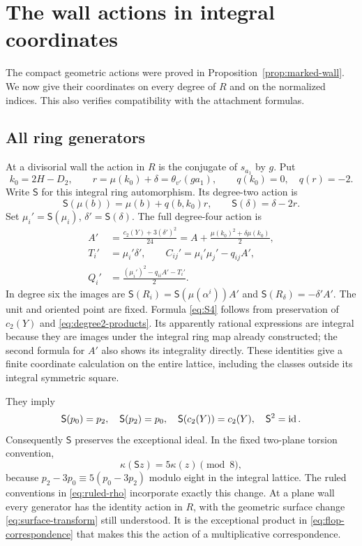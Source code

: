 \section{The wall actions in integral coordinates}\label{sec:actions}

The compact geometric actions were proved in
Proposition~\ref{prop:marked-wall}. We now give their
coordinates on every degree of $R$ and on the normalized
indices. This also verifies compatibility with the
attachment formulas.

\subsection{All ring generators}
At a divisorial wall the action in $R$ is the conjugate
of $s_{a_1}$ by $g$. Put
\begin{equation}\label{eq:reflection-root}
 k_0=2H-D_2,\qquad r=\mu(k_0)+\delta
             =\theta_{v'}(ga_1),\qquad q(k_0)=0,
 \quad q(r)=-2.
\end{equation}
Write $\mathsf S$ for this integral ring automorphism. Its degree-two
action is
\begin{equation}\label{eq:S2}
 \mathsf S(\mu(b))=\mu(b)+q(b,k_0)r,\qquad \mathsf S(\delta)=\delta-2r.
\end{equation}
Set $\mu_i'=\mathsf S(\mu_i)$, $\delta'=\mathsf S(\delta)$. The full
degree-four action is
\begin{equation}\label{eq:S4}
 \begin{aligned}
 A'&=\frac{c_2(Y)+3(\delta')^2}{24}
     =A+\frac{\mu(k_0)^2+\delta\mu(k_0)}2,\\
 T_i'&=\mu_i'\delta',\qquad
 C_{ij}'=\mu_i'\mu_j'-q_{ij}A',\\
 Q_i'&=\frac{(\mu_i')^2-q_{ii}A'-T_i'}2.
 \end{aligned}
\end{equation}
In degree six the images are
$\mathsf S(R_i)=\mathsf S(\mu(\alpha^i))A'$ and
$\mathsf S(R_\delta)=-\delta'A'$. The unit and oriented point are
fixed. Formula \eqref{eq:S4} follows from preservation of
$c_2(Y)$ and \eqref{eq:degree2-products}. Its apparently
rational expressions are integral because they are images
under the integral ring map already constructed; the
second formula for $A'$ also shows its integrality
directly. These identities give a finite coordinate
calculation on the entire lattice, including the classes
outside its integral symmetric square.

They imply
\begin{equation}\label{eq:planes-reflection}
 \mathsf S(p_0)=p_2,\quad \mathsf S(p_2)=p_0,\quad \mathsf S(c_2(Y))=c_2(Y),
 \quad \mathsf S^2=\operatorname{id}.
\end{equation}
Consequently $\mathsf S$ preserves the exceptional ideal. In the
fixed two-plane torsion convention,
\[
 \kappa(\mathsf S z)=5\kappa(z)\pmod8,
\]
because $p_2-3p_0\equiv5(p_0-3p_2)$ modulo eight in
the integral lattice. The ruled conventions in
\eqref{eq:ruled-rho} incorporate exactly this change.
At a plane wall every generator has the identity action
in $R$, with the geometric surface change
\eqref{eq:surface-transform} still understood. It is the
exceptional product in \eqref{eq:flop-correspondence}
that makes this the action of a multiplicative
correspondence.

